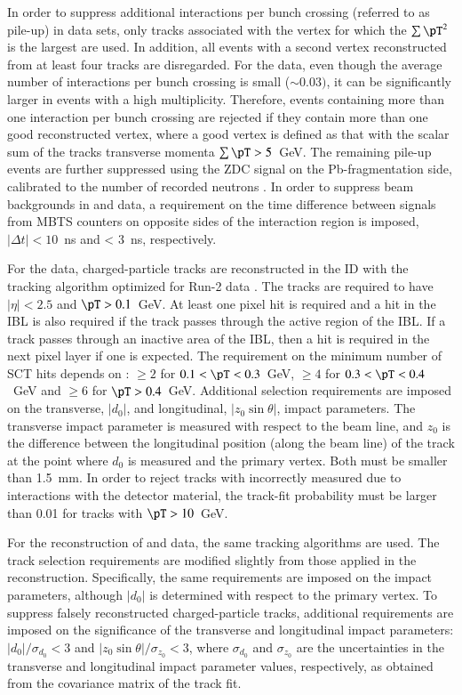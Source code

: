 \documentclass[cernpreprint,texlive=2014,txfonts,UKenglish]{latex/atlasdoc}
\begin{document}
In order to suppress additional interactions per bunch crossing (referred to as pile-up) in \pp data sets, only tracks associated with the vertex for which the $\sum \pT^{2}$ is the largest are used. In addition, all events with a second vertex reconstructed from at least four  tracks are disregarded. 
For the \pPb data, even though the average number of interactions per bunch crossing is small ($\sim 0.03)$, it can be significantly larger in events with a high multiplicity. Therefore, events containing more than one interaction per bunch crossing are rejected if they contain more than one good reconstructed vertex, where a good vertex is defined as that with the scalar sum of the tracks transverse momenta $\sum{\pT} > 5$~GeV. The remaining pile-up events are further suppressed using the ZDC signal on the Pb-fragmentation side, calibrated to the number of recorded neutrons \cite{pPbatlas3}. In order to suppress beam backgrounds in \pPb and \PbPb data, a requirement on the time difference between signals from MBTS counters on opposite sides of the interaction region is imposed, $|\Delta t| < 10$~ns and < 3~ns, respectively.  

For the \pp data, charged-particle tracks are reconstructed in the ID with the tracking algorithm optimized for Run-2 data \cite{ATL-PHYS-PUB-2015-006}. The tracks are required to have
$|\eta| < 2.5 $ and $\pT > 0.1$~GeV. At least one pixel hit is required and a hit in the IBL is also required if the track passes through the active region of the IBL. If a track passes through an inactive area of the IBL, then a hit is required in the next pixel layer if one is expected. The requirement on the minimum number of SCT hits depends on \pT:
$\geq 2$ for $0.1 < \pT < 0.3$~GeV, $\geq 4$ for $0.3 < \pT < 0.4$~GeV and $\geq 6$ for $\pT > 0.4$~GeV. Additional selection requirements are imposed on the transverse, $|d_0|$, and longitudinal, $|z_0 \sin  \theta| $, impact parameters. The transverse impact parameter is measured with respect to the beam line, and $z_0$ is the difference between the longitudinal position (along the beam line) of the track at the point where $d_0$ is measured and the primary vertex. Both must be smaller than 1.5~mm. In order to reject tracks with incorrectly measured \pT due to interactions with the detector material, the track-fit probability must be larger than 0.01 for tracks with $\pT >10$~GeV.  

For the reconstruction of \pPb and \PbPb data, the same tracking algorithms are used. The track selection requirements are modified slightly from those applied in the \pp reconstruction. Specifically, the same requirements are imposed on the impact parameters, although $|d_0|$ is determined with respect to the primary vertex. To suppress falsely reconstructed charged-particle tracks, additional requirements are imposed on the significance of the transverse and longitudinal impact parameters: $|d_0|/\sigma_{d_0}<3$ and $|z_0\sin \theta| /\sigma_{z_0}<3$, where $\sigma_{d_0}$ and $\sigma_{z_0}$ are the uncertainties in the transverse and longitudinal impact parameter values, respectively, as obtained from the covariance matrix of the track fit. 
\end{document}
